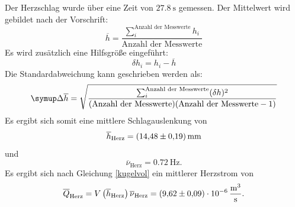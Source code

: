 \noindent
Der Herzschlag wurde über eine Zeit von $\SI{27.8}{\second}$ gemessen.
Der Mittelwert wird gebildet nach der Vorschrift:
\begin{equation}
	\overline{h} = \frac{\sum_i^\text{Anzahl der Messwerte}h_i}{\text{Anzahl der Messwerte}}
\end{equation}
Es wird zusätzlich eine Hilfsgröße eingeführt:
\begin{equation}
	\delta h_i = h_i-\overline{h}
\end{equation}
Die Standardabweichung kann geschrieben werden als:
\begin{equation}
	\symup\Delta\overline{h} = \sqrt{\frac{\sum_i^\text{Anzahl der Messwerte}(\delta h)^2}{(\text{Anzahl der Messwerte})(\text{Anzahl der Messwerte} - 1)}}
\end{equation}
Es ergibt sich somit eine mittlere Schlagauslenkung von
\begin{equation}
   \overline{h}_\text{Herz} = \SI{14.48\pm0.19}{\milli\meter}
\end{equation}
und
\begin{equation}
   \overline{\nu}_\text{Herz} = \SI{0.72}{\hertz}.
\end{equation}
Es ergibt sich nach Gleichung \eqref{kugelvol} ein mittlerer Herzstrom von
\begin{equation}
   \overline{Q}_\text{Herz} = V\left(\overline{h}_\text{Herz}\right)\overline{\nu}_\text{Herz} = \SI{9.62\pm0.09e-6}{\meter\cubed\per\second}.
\end{equation}
